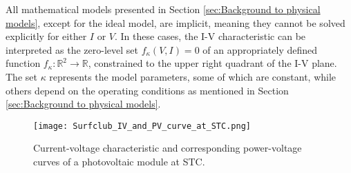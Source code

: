 All mathematical models presented in Section
\ref{sec:Background to physical models}, except for the
ideal model, are implicit, meaning they cannot be solved
explicitly for either \(I\) or \(V\). In these cases, the I-V
characteristic can be interpreted as the zero-level
set \(f_{\kappa}(V, I) = 0\)  of an appropriately defined
function \(f_{\kappa}: \mathbb{R}^2 \rightarrow \mathbb{R}\),
constrained to the upper right quadrant of the I-V plane.
The set \(\kappa\) represents the model parameters, some of
which are constant, while others depend on the operating
conditions as mentioned in Section \ref{sec:Background to physical models}.

\begin{figure}[H]
    \centering
    \texttt{[image: Surfclub\_IV\_and\_PV\_curve\_at\_STC.png]}
    \caption{\small Current-voltage characteristic and corresponding power-voltage curves of a photovoltaic module at STC.}
    \label{fig:Surfclub_IV_and_PV_curve_at_STC}
\end{figure}
